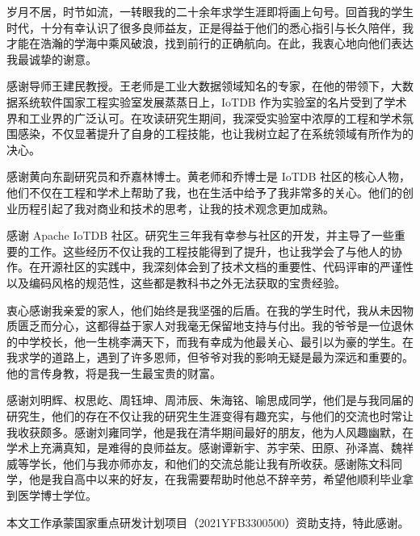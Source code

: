 
\begin{acknowledgements}
岁月不居，时节如流，一转眼我的二十余年求学生涯即将画上句号。回首我的学生时代，十分有幸认识了很多良师益友，正是得益于他们的悉心指引与长久陪伴，我才能在浩瀚的学海中乘风破浪，找到前行的正确航向。在此，我衷心地向他们表达我最诚挚的谢意。

感谢导师王建民教授。王老师是工业大数据领域知名的专家，在他的带领下，大数据系统软件国家工程实验室发展蒸蒸日上，IoTDB 作为实验室的名片受到了学术界和工业界的广泛认可。在攻读研究生期间，我深受实验室中浓厚的工程和学术氛围感染，不仅显著提升了自身的工程技能，也让我树立起了在系统领域有所作为的决心。

感谢黄向东副研究员和乔嘉林博士。黄老师和乔博士是 IoTDB 社区的核心人物，他们不仅在工程和学术上帮助了我，也在生活中给予了我非常多的关心。他们的创业历程引起了我对商业和技术的思考，让我的技术观念更加成熟。

感谢 Apache IoTDB 社区。研究生三年我有幸参与社区的开发，并主导了一些重要的工作。这些经历不仅让我的工程技能得到了提升，也让我学会了与他人的协作。在开源社区的实践中，我深刻体会到了技术文档的重要性、代码评审的严谨性以及编码风格的规范性，这些都是教科书之外无法获取的宝贵经验。

衷心感谢我亲爱的家人，他们始终是我坚强的后盾。在我的学生时代，我从未因物质匮乏而分心，这都得益于家人对我毫无保留地支持与付出。我的爷爷是一位退休的中学校长，他一生桃李满天下，而我有幸成为他最关心、最引以为豪的学生。在我求学的道路上，遇到了许多恩师，但爷爷对我的影响无疑是最为深远和重要的。他的言传身教，将是我一生最宝贵的财富。

感谢刘明辉、权思屹、周钰坤、周沛辰、朱海铭、喻思成同学，他们是与我同届的研究生，他们的存在不仅让我的研究生生涯变得有趣充实，与他们的交流也时常让我收获颇多。感谢刘雍同学，他是我在清华期间最好的朋友，他为人风趣幽默，在学术上充满真知，是难得的良师益友。感谢谭新宇、苏宇荣、田原、孙泽嵩、魏祥威等学长，他们与我亦师亦友，和他们的交流总能让我有所收获。感谢陈文科同学，他是我自高中以来的好友，在我需要帮助时他总不辞辛劳，希望他顺利毕业拿到医学博士学位。

本文工作承蒙国家重点研发计划项目（2021YFB3300500）资助支持，特此感谢。 

\end{acknowledgements}
